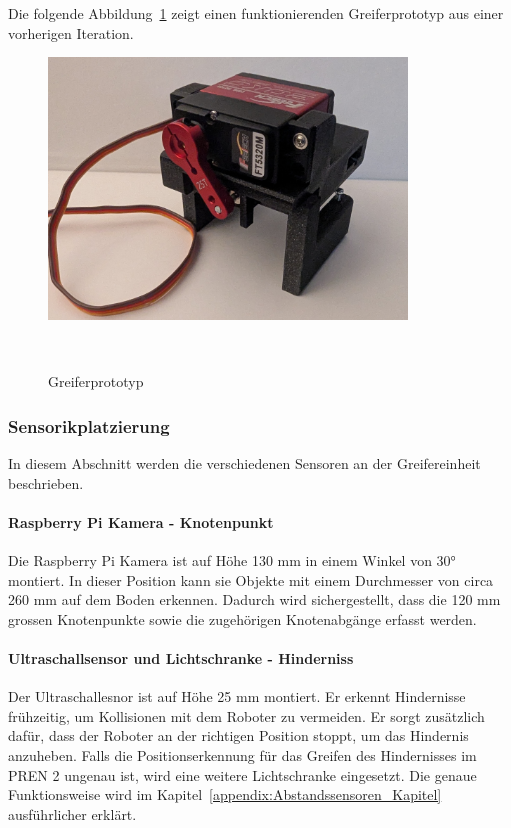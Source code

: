\documentclass[main.tex]{subfiles} %
\begin{document}
\newpage

Die folgende Abbildung~\ref{fig:Greiferprototyp} zeigt einen funktionierenden Greiferprototyp 
aus einer vorherigen Iteration.

\begin{figure}[H]
    \centering
    \includegraphics[width=0.85\textwidth]{Greiferprototyp.jpg}
    \caption{Greiferprototyp}~\label{fig:Greiferprototyp}
\end{figure}

\subsubsection*{Sensorikplatzierung}

In diesem Abschnitt werden die verschiedenen Sensoren an der Greifereinheit beschrieben.

\paragraph{Raspberry Pi Kamera - Knotenpunkt}
Die Raspberry Pi Kamera ist auf Höhe 130 mm in einem Winkel von 30° montiert.
In dieser Position kann sie Objekte mit einem Durchmesser von circa 260 mm auf dem Boden erkennen.
Dadurch wird sichergestellt, dass die 120 mm grossen Knotenpunkte sowie die zugehörigen
Knotenabgänge erfasst werden.


\paragraph{Ultraschallsensor und Lichtschranke - Hinderniss}
Der Ultraschallesnor ist auf Höhe 25 mm montiert. Er erkennt Hindernisse frühzeitig,
um Kollisionen mit dem Roboter zu vermeiden. Er sorgt zusätzlich dafür, dass der Roboter an der richtigen 
Position stoppt, um das Hindernis anzuheben. Falls die Positionserkennung für das Greifen 
des Hindernisses im PREN 2 ungenau ist, wird eine weitere Lichtschranke eingesetzt.
Die genaue Funktionsweise wird im Kapitel~\ref{appendix:Abstandssensoren_Kapitel} ausführlicher erklärt.
\end{document}
